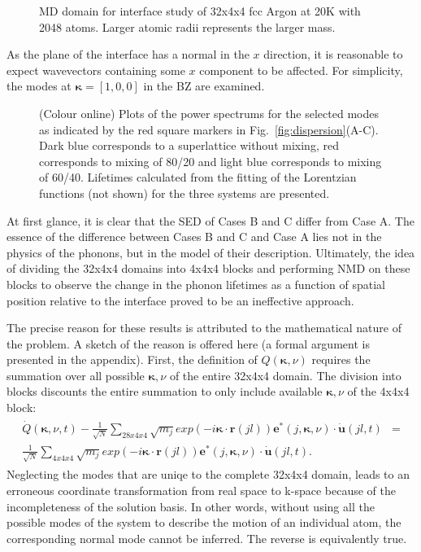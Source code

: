 \begin{figure}[ht!]
\begin{center}
\renewcommand{\figure}{Fig.}
\caption{MD domain for interface study of 32x4x4 fcc Argon at 20K with 2048 atoms. Larger atomic radii represents the larger mass.}
\label{fig:md_domain}
\end{center}
\end{figure}
As the plane of the interface has a normal in the $x$ direction, it is reasonable to expect wavevectors containing some $x$ component to be affected. For simplicity, the modes at $\bm{\kappa}=[1,0,0]$ in the BZ are examined. 
\renewcommand{\topfraction}{1.0}
\begin{figure*}%
\begin{center}
\renewcommand{\figure}{Fig.}
\caption{(Colour online) Plots of the power spectrums for the selected modes as indicated by the red square markers in Fig.~\ref{fig:dispersion}(A-C). Dark blue corresponds to a superlattice without mixing, red corresponds to mixing of 80/20 and light blue corresponds to mixing of 60/40. Lifetimes calculated from the fitting of the Lorentzian functions (not shown) for the three systems are presented.}
\label{fig:sed}
\end{center}
\end{figure*}
At first glance, it is clear that the SED of Cases B and C differ from Case A. The essence of the difference between Cases B and C and Case A lies not in the physics of the phonons, but in the model of their description. Ultimately, the idea of dividing the 32x4x4 domains into 4x4x4 blocks and performing NMD on these blocks to observe the change in the phonon lifetimes as a function of spatial position relative to the interface proved to be an ineffective approach.

The precise reason for these results is attributed to the mathematical nature of the problem. A sketch of the reason is offered here (a formal argument is presented in the appendix). First, the definition of $Q(\bm{\kappa},\nu)$ requires the summation over all possible $\bm{\kappa},\nu$ of the entire 32x4x4 domain. The division into blocks discounts the entire summation to only include available $\bm{\kappa},\nu$ of the 4x4x4 block:
\begin{eqnarray}
\begin{split}
\dot{Q}(\bm{\kappa},\nu,t)-\frac{1}{\sqrt{N}}\sum_{28x4x4}\sqrt{m_j}exp(-i\bm{\kappa}\cdot\bm{r}(jl))\bm{e}^*(j,\bm{\kappa},\nu)\cdot\dot{\bm{u}}(jl,t)&=\\\frac{1}{\sqrt{N}}\sum_{4x4x4}\sqrt{m_j}exp(-i\bm{\kappa}\cdot\bm{r}(jl))\bm{e}^*(j,\bm{\kappa},\nu)\cdot\dot{\bm{u}}(jl,t).
\end{split}
\end{eqnarray}
Neglecting the modes that are uniqe to the complete 32x4x4 domain, leads to an erroneous coordinate transformation from real space to k-space because of the incompleteness of the solution basis. In other words, without using all the possible modes of the system to describe the motion of an individual atom, the corresponding normal mode cannot be inferred. The reverse is equivalently true.

